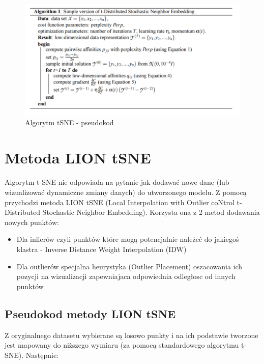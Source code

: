 \documentclass{article}
\begin{document}
\begin{figure}[h]
\includegraphics[scale=0.52]{algorithm_TSNE_pseudocode.PNG}
\caption{Algorytm tSNE - pseudokod}
\end{figure}

\section{Metoda LION tSNE}
\label{sec:lionTSNE}
\paragraph{}
Algorytm t-SNE nie odpowiada na pytanie jak dodawać nowe dane (lub
wizualizować dynamiczne zmiany danych) do utworzonego modelu. Z
pomocą przychodzi metoda LION tSNE (Local Interpolation with Outlier
coNtrol t-Distributed Stochastic Neighbor Embedding). Korzysta ona z 2
metod dodawania nowych punktów:

\begin{itemize}
    \item 
Dla inlierów czyli punktów które mogą potencjalnie należeć do jakiegoś
klastra - Inverse Distance Weight Interpolation (IDW)
\item
Dla outlierów specjalna heurystyka (Outlier Placement) oszacowania
ich pozycji na wizualizacji zapewniajaca odpowiednia odległosc od
innych punktów
\end{itemize}

\subsection{Pseudokod metody LION tSNE}

Z oryginalnego datasetu wybierane są losowo punkty i na ich podstawie
tworzone jest mapowany do niższego wymiaru (za pomocą standardowego
algorytmu t-SNE). Następnie:
\end{document}
